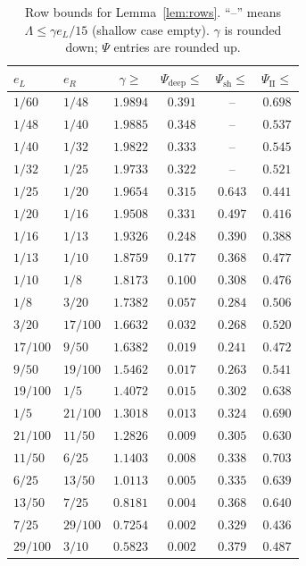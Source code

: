 \documentclass[11pt]{amsart}
\begin{document}
\begin{table}[h]
\centering\small
\caption{Row bounds for Lemma~\ref{lem:rows}.  ``--'' means
$\Lambda\le\gamma e_L/15$ (shallow case empty).  $\gamma$ is rounded down;
$\Psi$ entries are rounded up.}\label{tab:rows}
\begin{tabular}{llcccc}
\toprule
$e_L$ & $e_R$ & $\gamma\ge$ & $\Psi_{\mathrm{deep}}\le$ &
$\Psi_{\mathrm{sh}}\le$ & $\Psi_{\mathrm{II}}\le$\\
\midrule
$1/60$ & $1/48$ & $1.9894$ & $0.391$ & -- & $0.698$\\
$1/48$ & $1/40$ & $1.9885$ & $0.348$ & -- & $0.537$\\
$1/40$ & $1/32$ & $1.9822$ & $0.333$ & -- & $0.545$\\
$1/32$ & $1/25$ & $1.9733$ & $0.322$ & -- & $0.521$\\
$1/25$ & $1/20$ & $1.9654$ & $0.315$ & $0.643$ & $0.441$\\
$1/20$ & $1/16$ & $1.9508$ & $0.331$ & $0.497$ & $0.416$\\
$1/16$ & $1/13$ & $1.9326$ & $0.248$ & $0.390$ & $0.388$\\
$1/13$ & $1/10$ & $1.8759$ & $0.177$ & $0.368$ & $0.477$\\
$1/10$ & $1/8$  & $1.8173$ & $0.100$ & $0.308$ & $0.476$\\
$1/8$  & $3/20$ & $1.7382$ & $0.057$ & $0.284$ & $0.506$\\
$3/20$ & $17/100$ & $1.6632$ & $0.032$ & $0.268$ & $0.520$\\
$17/100$ & $9/50$ & $1.6382$ & $0.019$ & $0.241$ & $0.472$\\
$9/50$ & $19/100$ & $1.5462$ & $0.017$ & $0.263$ & $0.541$\\
$19/100$ & $1/5$ & $1.4072$ & $0.015$ & $0.302$ & $0.638$\\
$1/5$ & $21/100$ & $1.3018$ & $0.013$ & $0.324$ & $0.690$\\
$21/100$ & $11/50$ & $1.2826$ & $0.009$ & $0.305$ & $0.630$\\
$11/50$ & $6/25$ & $1.1403$ & $0.008$ & $0.338$ & $0.703$\\
$6/25$ & $13/50$ & $1.0113$ & $0.005$ & $0.335$ & $0.639$\\
$13/50$ & $7/25$ & $0.8181$ & $0.004$ & $0.368$ & $0.640$\\
$7/25$ & $29/100$ & $0.7254$ & $0.002$ & $0.329$ & $0.436$\\
$29/100$ & $3/10$ & $0.5823$ & $0.002$ & $0.379$ & $0.487$\\
\bottomrule
\end{tabular}
\end{table}
\end{document}
